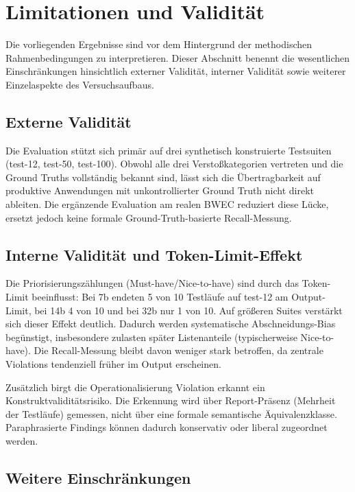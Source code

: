\section{Limitationen und Validität}
\label{sec:limitationen}

Die vorliegenden Ergebnisse sind vor dem Hintergrund der methodischen Rahmenbedingungen zu interpretieren. Dieser Abschnitt benennt die wesentlichen Einschränkungen hinsichtlich externer Validität, interner Validität sowie weiterer Einzelaspekte des Versuchsaufbaus.

\subsection{Externe Validität}
\label{sec:limit_extern}

Die Evaluation stützt sich primär auf drei synthetisch konstruierte Testsuiten (test-12, test-50, test-100). Obwohl alle drei Verstoßkategorien vertreten und die Ground Truths vollständig bekannt sind, lässt sich die Übertragbarkeit auf produktive Anwendungen mit unkontrollierter Ground Truth nicht direkt ableiten. Die ergänzende Evaluation am realen \ac{BWEC} reduziert diese Lücke, ersetzt jedoch keine formale Ground-Truth-basierte Recall-Messung.

\subsection{Interne Validität und Token-Limit-Effekt}
\label{sec:limit_tokenlimit}

Die Priorisierungszählungen (Must-have/Nice-to-have) sind durch das Token-Limit beeinflusst: Bei 7b endeten 5 von 10 Testläufe auf test-12 am Output-Limit, bei 14b 4 von 10 und bei 32b nur 1 von 10. Auf größeren Suites verstärkt sich dieser Effekt deutlich. Dadurch werden systematische Abschneidungs-Bias begünstigt, insbesondere zulasten später Listenanteile (typischerweise Nice-to-have). Die Recall-Messung bleibt davon weniger stark betroffen, da zentrale Violations tendenziell früher im Output erscheinen.

Zusätzlich birgt die Operationalisierung \glqq{}Violation erkannt\grqq{} ein Konstruktvaliditätsrisiko. Die Erkennung wird über Report-Präsenz (Mehrheit der Testläufe) gemessen, nicht über eine formale semantische Äquivalenzklasse. Paraphrasierte Findings können dadurch konservativ oder liberal zugeordnet werden.

\subsection{Weitere Einschränkungen}
\label{sec:limit_weitere}

